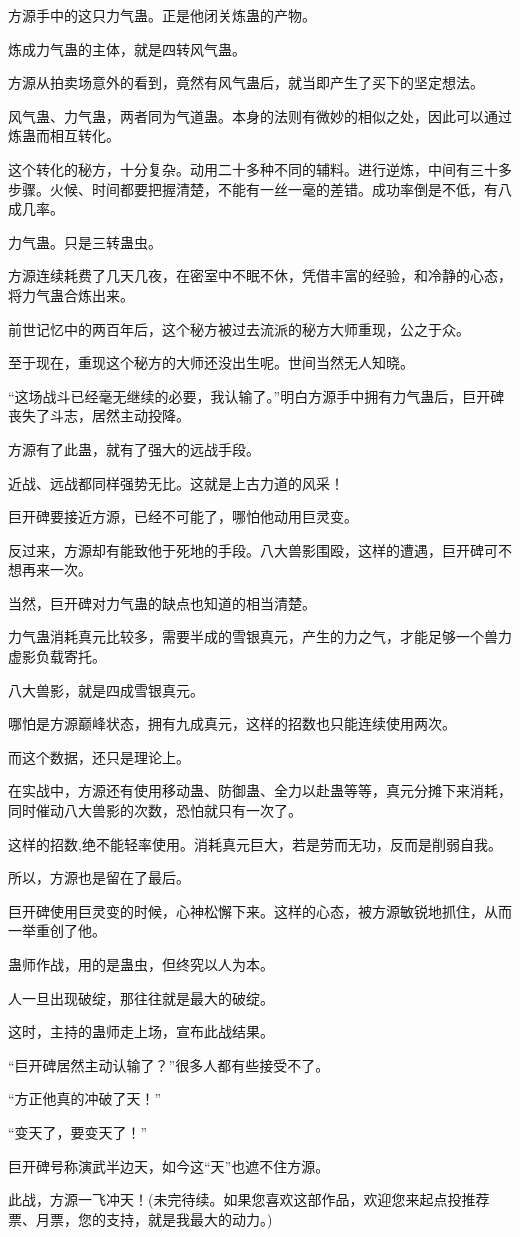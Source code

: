 \begin{this_body}
方源手中的这只力气蛊。正是他闭关炼蛊的产物。

炼成力气蛊的主体，就是四转风气蛊。

方源从拍卖场意外的看到，竟然有风气蛊后，就当即产生了买下的坚定想法。

风气蛊、力气蛊，两者同为气道蛊。本身的法则有微妙的相似之处，因此可以通过炼蛊而相互转化。

这个转化的秘方，十分复杂。动用二十多种不同的辅料。进行逆炼，中间有三十多步骤。火候、时间都要把握清楚，不能有一丝一毫的差错。成功率倒是不低，有八成几率。

力气蛊。只是三转蛊虫。

方源连续耗费了几天几夜，在密室中不眠不休，凭借丰富的经验，和冷静的心态，将力气蛊合炼出来。

前世记忆中的两百年后，这个秘方被过去流派的秘方大师重现，公之于众。

至于现在，重现这个秘方的大师还没出生呢。世间当然无人知晓。

“这场战斗已经毫无继续的必要，我认输了。”明白方源手中拥有力气蛊后，巨开碑丧失了斗志，居然主动投降。

方源有了此蛊，就有了强大的远战手段。

近战、远战都同样强势无比。这就是上古力道的风采！

巨开碑要接近方源，已经不可能了，哪怕他动用巨灵变。

反过来，方源却有能致他于死地的手段。八大兽影围殴，这样的遭遇，巨开碑可不想再来一次。

当然，巨开碑对力气蛊的缺点也知道的相当清楚。

力气蛊消耗真元比较多，需要半成的雪银真元，产生的力之气，才能足够一个兽力虚影负载寄托。

八大兽影，就是四成雪银真元。

哪怕是方源巅峰状态，拥有九成真元，这样的招数也只能连续使用两次。

而这个数据，还只是理论上。

在实战中，方源还有使用移动蛊、防御蛊、全力以赴蛊等等，真元分摊下来消耗，同时催动八大兽影的次数，恐怕就只有一次了。

这样的招数,绝不能轻率使用。消耗真元巨大，若是劳而无功，反而是削弱自我。

所以，方源也是留在了最后。

巨开碑使用巨灵变的时候，心神松懈下来。这样的心态，被方源敏锐地抓住，从而一举重创了他。

蛊师作战，用的是蛊虫，但终究以人为本。

人一旦出现破绽，那往往就是最大的破绽。

这时，主持的蛊师走上场，宣布此战结果。

“巨开碑居然主动认输了？”很多人都有些接受不了。

“方正他真的冲破了天！”

“变天了，要变天了！”

巨开碑号称演武半边天，如今这“天”也遮不住方源。

此战，方源一飞冲天！(未完待续。如果您喜欢这部作品，欢迎您来起点投推荐票、月票，您的支持，就是我最大的动力。)

\end{this_body}

